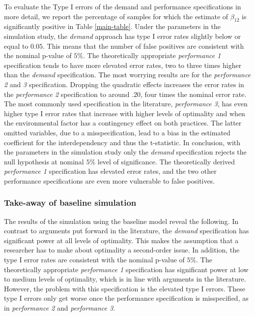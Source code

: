 \documentclass[12pt]{article}
\begin{document}
To evaluate the Type I errors of the demand and performance specifications in more detail, we report the percentage of samples for which the estimate of $\beta_{12}$ is significantly positive in Table \ref{main-table}. Under the parameters in the simulation study, the \emph{demand} approach has type I error rates slightly below or equal to $0.05$. This means that the number of false positives are consistent with the nominal p-value of $5\%$. The theoretically appropriate \emph{performance 1} specification tends to have more elevated error rates, two to three times higher than the \emph{demand} specification. The most worrying results are for the \emph{performance 2} and \emph{3} specification. Dropping the quadratic effects increases the error rates in the \emph{performance 2} specification to around $.20$, four times the nominal error rate. The most commonly used specification in the literature, \emph{performance 3}, has even higher type I error rates that increase with higher levels of optimality and when the environmental factor has a contingency effect on both practices. The latter omitted variables, due to a misspecification, lead to a bias in the estimated coefficient for the interdependency and thus the t-statistic. In conclusion, with the parameters in the simulation study only the \emph{demand} specification rejects the null hypothesis at nominal $5\%$ level of significance. The theoretically derived \emph{performance 1} specification has elevated error rates, and the two other performance specifications are even more vulnerable to false positives.

\subsubsection{Take-away of baseline simulation}\label{Take-away of baseline simulation}
The results of the simulation using the baseline model reveal the following. In contrast to arguments put forward in the literature, the \emph{demand} specification has significant power at all levels of optimality. This makes the assumption that a researcher has to make about optimality a second-order issue. In addition, the type I error rates are consistent with the nominal p-value of $5\%$. The theoretically appropriate \emph{performance 1} specification has significant power at low to medium levels of optimality, which is in line with arguments in the literature. However, the problem with this specification is the elevated type I errors. These type I errors only get worse once the performance specification is misspecified, as in \emph{performance 2} and \emph{performance 3}.
\end{document}
